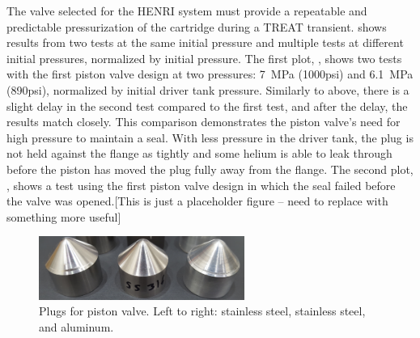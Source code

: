 The valve selected for the HENRI system must provide a repeatable and predictable pressurization of the cartridge during a TREAT transient.  shows results from two tests at the same initial pressure and multiple tests at different initial pressures, normalized by initial pressure. The first plot, , shows two tests with the first piston valve design at two pressures: \SI{7}{\mega\pascal} (1000psi) and \SI{6.1}{\mega\pascal} (890psi), normalized by initial driver tank pressure. Similarly to above, there is a slight delay in the second test compared to the first test, and after the delay, the results match closely. This comparison demonstrates the piston valve's need for high pressure to maintain a seal. With less pressure in the driver tank, the plug is not held against the flange as tightly and some helium is able to leak through before the piston has moved the plug fully away from the flange. The second plot, , shows a test using the first piston valve design in which the seal failed before the valve was opened.[This is just a placeholder figure -- need to replace with something more useful]



\begin{figure}[tb]
    \vspace{16pt}
    \centering
    \includegraphics[width=0.6\textwidth]{design/photos/plug_gen1_wear_crop.png}
    \caption{Plugs for piston valve. Left to right: stainless steel, stainless steel, and aluminum.}
    \label{fig:plug wear}
    \vspace{16pt}
\end{figure}

